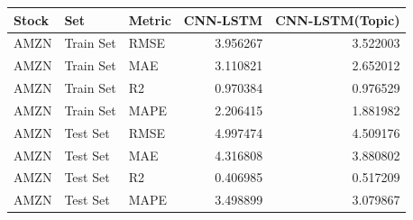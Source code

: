 \begin{tabular}{lllrr}
\toprule
Stock & Set & Metric & CNN-LSTM & CNN-LSTM(Topic) \\
\midrule
AMZN & Train Set & RMSE & 3.956267 & 3.522003 \\
AMZN & Train Set & MAE & 3.110821 & 2.652012 \\
AMZN & Train Set & R2 & 0.970384 & 0.976529 \\
AMZN & Train Set & MAPE & 2.206415 & 1.881982 \\
AMZN & Test Set & RMSE & 4.997474 & 4.509176 \\
AMZN & Test Set & MAE & 4.316808 & 3.880802 \\
AMZN & Test Set & R2 & 0.406985 & 0.517209 \\
AMZN & Test Set & MAPE & 3.498899 & 3.079867 \\
\bottomrule
\end{tabular}
